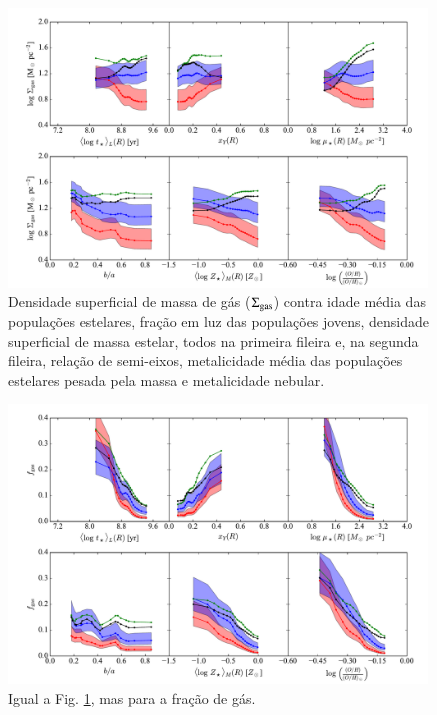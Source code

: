 \begin{figure}
	\centering
 	\includegraphics[width=0.99\textwidth]{figuras/props_SigmaGas.pdf}
 	\caption[Propriedades físicas e $\SigmaGas$.]
 	{Densidade superficial de massa de gás ($\SigmaGas$) contra idade média das populações estelares,
fração em luz das populações jovens, densidade superficial de massa estelar, todos na primeira
fileira e, na segunda fileira, relação de semi-eixos, metalicidade média das populações estelares
pesada pela massa e metalicidade nebular.}
	\label{fig:propsSigmaGas}
\end{figure}

\begin{figure}
	\centering
 	\includegraphics[width=0.99\textwidth]{figuras/props_fGas.pdf}
 	\caption[Propriedades físicas e $f_{\mathrm{gas}}$.]
 	{Igual a Fig. \ref{fig:propsSigmaGas}, mas para a fração de gás.}
 	\label{fig:propsfGas}
\end{figure} 

